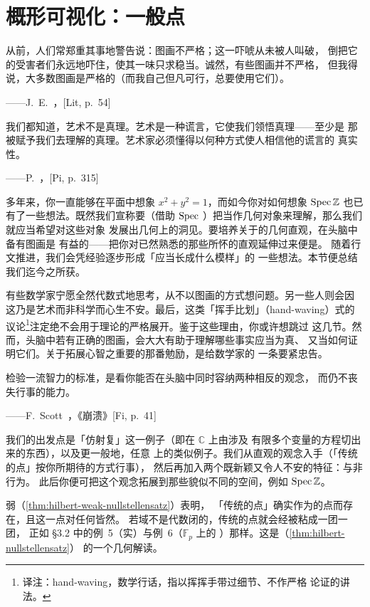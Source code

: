 
\section{概形可视化：一般点}

\epigraph
  {从前，人们常郑重其事地警告说：图画不严格；这一吓唬从未被人叫破，
   倒把它的受害者们永远地吓住，使其一味只求稳当。诚然，有些图画并不严格，
   但我得说，大多数图画是严格的（而我自己但凡可行，总要使用它们）。}
  {——J.~E.~\trLittlewood，[Lit, p.~54]}
\epigraph
  {我们都知道，艺术不是真理。艺术是一种谎言，它使我们领悟真理——至少是
   那被赋予我们去理解的真理。艺术家必须懂得以何种方式使人相信他的谎言的
   真实性。}
  {——P.~\trPicasso，[Pi, p.~315]}

多年来，你一直能够在平面中想象 $x^2+y^2=1$，而如今你对如何想象
$\operatorname{Spec} \mathbb{Z}$ 也已有了一些想法。既然我们宣称要（借助 $\operatorname{Spec}$
\trFunctor）把\trRing{}当作几何对象来理解，那么我们就应当希望对这些对象
发展出几何上的洞见。要培养关于\trScheme{}的几何直观，在头脑中备有图画是
有益的——把你对已然熟悉的那些\trGeometricSpace{}所怀的直观延伸过来便是。
随着行文推进，我们会凭经验逐步形成「\trScheme{}应当长成什么模样」的
一些想法。本节便总结我们迄今之所获。

有些数学家宁愿全然代数式地思考，从不以图画的方式想问题。另一些人则会因
这乃是艺术而非科学而心生不安。最后，这类「挥手比划」（hand-waving）式的
议论\footnote{译注：hand-waving，数学行话，指以挥挥手带过细节、不作严格
论证的讲法。}注定绝不会用于理论的严格展开。鉴于这些理由，你或许想跳过
这几节。然而，头脑中若有正确的图画，会大大有助于理解哪些事实应当为真、
又当如何证明它们。\trFitzGerald{}关于拓展心智之重要的那番勉励，是给数学家的
一条要紧忠告。

\epigraph
  {检验一流智力的标准，是看你能否在头脑中同时容纳两种相反的观念，
   而仍不丧失行事的能力。}
  {——F.~Scott~\trFitzGerald，《崩溃》[Fi, p.~41]}

我们的出发点是「仿射复\trVariety」这一例子（即在 $\mathbb{C}$ 上由涉及
有限多个变量的方程切出来的东西），以及更一般地，任意\trAlgClosedField{}
上的类似例子。我们从直观的观念入手（「传统的点」按你所期待的方式行事），
然后再加入两个既新颖又令人不安的特征：\trGenericPoint{}与非\trReduced{}行为。
此后你便可把这个观念拓展到那些貌似不同的空间，例如 $\operatorname{Spec} \mathbb{Z}$。

\trHilbert{}弱\trNullstellensatz（\cref{thm:hilbert-weak-nullstellensatz}）表明，
「传统的点」确实作为\trScheme{}的点而存在，且这一点对任何\trAlgClosedField{}皆然。
若域不是代数闭的，传统的点就会经\trGalois{}\trConjugate{}被粘成一团一团，
正如 \S3.2 中的例~5（实\trAffineLine）与例~6（$\mathbb{F}_p$ 上的%
\trAffineLine）那样。这是\trHilbert{}\trNullstellensatz（\cref{thm:hilbert-nullstellensatz}）
的一个几何解读。

